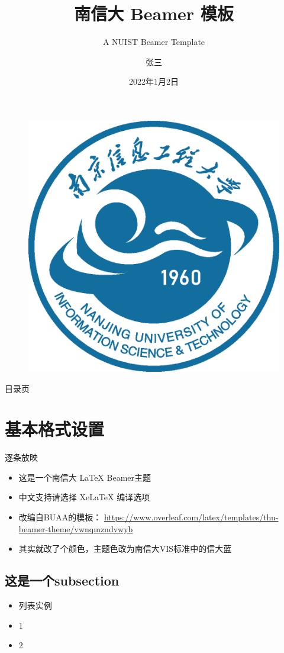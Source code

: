 \documentclass{beamer}
\author{张三}
\title{南信大 Beamer 模板}
\subtitle{A NUIST Beamer Template}
\institute{大气物理学院}
\date{2022年1月2日}
\begin{document}
\kaishu
\begin{frame}
    \titlepage
    \begin{figure}[htpb]
        \begin{center}
            \includegraphics[width=0.2\linewidth]{pic/nuist_logo.eps}
        \end{center}
    \end{figure}
\end{frame}

\begin{frame}{目录页}
    \tableofcontents[sectionstyle=show,subsectionstyle=show/shaded/hide,subsubsectionstyle=show/shaded/hide]
\end{frame}


\section{基本格式设置}

\begin{frame}{逐条放映}
    \begin{itemize}[<+-| alert@+>] %
        \item 这是一个南信大 \LaTeX{} Beamer主题
        \item 中文支持请选择 Xe\LaTeX{} 编译选项
        \item 改编自BUAA的模板： \url{https://www.overleaf.com/latex/templates/thu-beamer-theme/vwnqmzndvwyb}
        \item 其实就改了个颜色，主题色改为南信大VIS标准中的信大蓝\cite{vis}
    \end{itemize}
\end{frame}

\subsection{这是一个subsection}

\begin{frame}
    \begin{itemize}
        \item 列表实例
        \item 1
        \item 2
    \end{itemize}
\end{frame}
\end{document}

